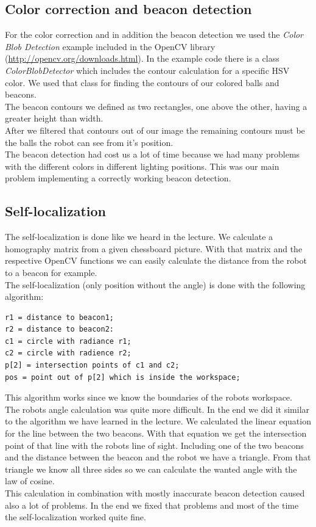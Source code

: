 \documentclass[703030]{./includes/iisreport}
\begin{document}
\subsection{Color correction and beacon detection}
For the color correction and in addition the beacon detection we used the 
\textit{Color Blob Detection} example included in the OpenCV library \\(\url{http://opencv.org/downloads.html}).
In the example code there is a class \textit{ColorBlobDetector} which includes
the contour calculation for a specific HSV color. We used that class for finding
the contours of our colored balls and beacons. \\
The beacon contours we defined as two rectangles, one above the other, having
a greater height than width. \\
After we filtered that contours out of our image the remaining contours must be
the balls the robot can see from it's position. \\
The beacon detection had cost us a lot of time because we had many problems
with the different colors in different lighting positions. This was our main problem
implementing a correctly working beacon detection.

\subsection{Self-localization}
The self-localization is done like we heard in the lecture. We calculate a homography
matrix from a given chessboard picture. With that matrix and the respective OpenCV
functions we can easily calculate the distance from the robot to a beacon for example. \\
The self-localization (only position without the angle) is done with the following algorithm:

\begin{lstlisting}[mathescape]
r1 = distance to beacon1;
r2 = distance to beacon2:
c1 = circle with radiance r1;
c2 = circle with radience r2;
p[2] = intersection points of c1 and c2;
pos = point out of p[2] which is inside the workspace;
\end{lstlisting}

\noindent This algorithm works since we know the boundaries of the robots workspace. \\
The robots angle calculation was quite more difficult. In the end we did it similar
to the algorithm we have learned in the lecture. We calculated the linear equation
for the line between the two beacons. With that equation we get the intersection point
of that line with the robots line of sight. Including one of the two beacons and the distance
between the beacon and the robot we have a triangle. From that triangle we know
all three sides so we can calculate the wanted angle with the law of cosine. \\
This calculation in combination with mostly inaccurate beacon detection caused also
a lot of problems. In the end we fixed that problems and most of the time the
self-localization worked quite fine.
\end{document}
